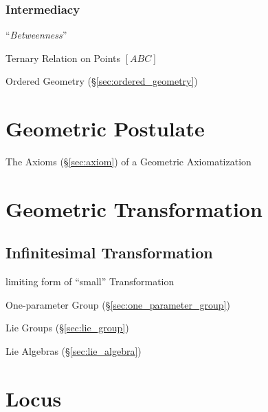 \subsubsection{Intermediacy}\label{sec:intermediacy}

``\emph{Betweenness}''

Ternary Relation on Points $[ABC]$

Ordered Geometry (\S\ref{sec:ordered_geometry})



\section{Geometric Postulate}\label{sec:geometric_postulate}

The Axioms (\S\ref{sec:axiom}) of a Geometric Axiomatization



\section{Geometric Transformation}\label{sec:geometric_transformation}


\subsection{Infinitesimal Transformation}
\label{sec:infinitesimal_transformation}

limiting form of ``small'' Transformation

One-parameter Group (\S\ref{sec:one_parameter_group})

Lie Groups (\S\ref{sec:lie_group})

Lie Algebras (\S\ref{sec:lie_algebra})



\section{Locus}\label{sec:locus}

